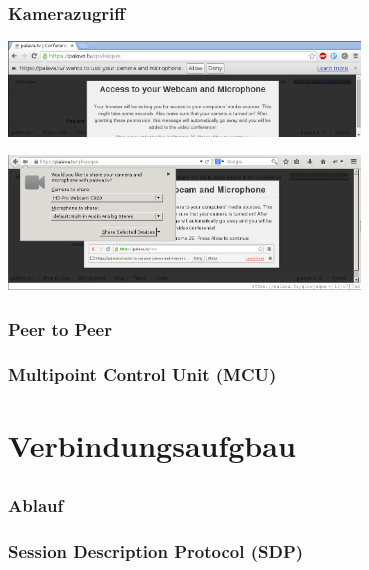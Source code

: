 \documentclass[12pt]{beamer}
\begin{document}
\begin{frame}
  \frametitle{Kamerazugriff}
  \pause
  \centerline{\includegraphics[width=0.7\textwidth]{img/access_chrome.png}}
  \vspace{15pt}
  \centerline{\includegraphics[width=0.7\textwidth]{img/access_firefox.png}}
\end{frame}

\begin{frame}
  \frametitle{Peer to Peer}
  \pause
  \centerline{}
\end{frame}

\begin{frame}
  \frametitle{Multipoint Control Unit (MCU)}
  \pause
  \centerline{}
\end{frame}

\section{Verbindungsaufgbau}
\subsection{} 

\begin{frame}
  \frametitle{Ablauf}
  \centerline{}
\end{frame}

\begin{frame}
  \frametitle{Session Description Protocol (SDP)}
  \pause
  \begin{multicols}{2}
    
  \end{multicols}
\end{frame}
\end{document}
